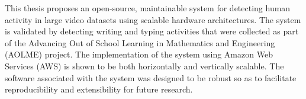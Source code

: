 This thesis proposes an open-source, maintainable system for detecting human
activity in large video datasets using scalable hardware architectures. The
system is validated by detecting writing and typing activities that were
collected as part of the Advancing Out of School Learning in Mathematics and
Engineering (AOLME) project. The implementation of the system using Amazon
Web Services (AWS) is shown to be both horizontally and vertically scalable.
The software associated with the system was designed to be robust so as to
facilitate reproducibility and extensibility for future research.
